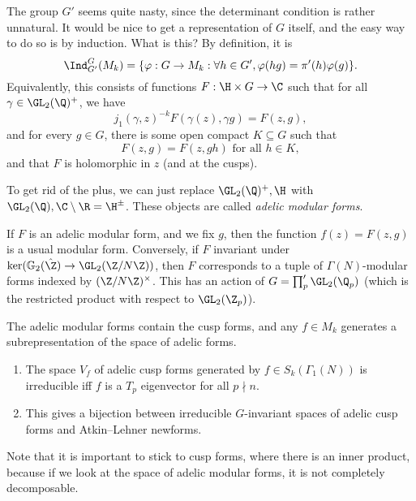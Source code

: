 \documentclass[a4paper]{article}
\renewcommand\G{\mathbb{G}}
\begin{document}
The group $G'$ seems quite nasty, since the determinant condition is rather unnatural. It would be nice to get a representation of $G$ itself, and the easy way to do so is by induction. What is this? By definition, it is
\[
  \Ind_{G'}^G(M_k) = \{\varphi: G \to M_k: \forall h \in G', \varphi(hg) = \pi'(h) \varphi(g)\}.
\]
Equivalently, this consists of functions $F: \H \times G \to \C$ such that for all $\gamma \in \GL_2(\Q)^+$, we have
\[
  j_1(\gamma, z)^{-k} F(\gamma(z), \gamma g) = F(z, g),
\]
and for every $g \in G$, there is some open compact $K \subseteq G$ such that
\[
  F(z, g) = F(z, gh) \text{ for all }h \in K,
\]
and that $F$ is holomorphic in $z$ (and at the cusps).

To get rid of the plus, we can just replace $\GL_2(\Q)^+, \H$ with $\GL_2(\Q), \C \setminus \R = \H^{\pm}$. These objects are called \emph{adelic modular forms}.

If $F$ is an adelic modular form, and we fix $g$, then the function $f(z) = F(z, g)$ is a usual modular form. Conversely, if $F$ invariant under $\ker (\G_2(\hat{\Z}) \to \GL_2(\Z/N\Z))$, then $F$ corresponds to a tuple of $\Gamma(N)$-modular forms indexed by $(\Z/N\Z)^\times$. This has an action of $G = \prod_p ' \GL_2(\Q_p)$ (which is the restricted product with respect to $\GL_2(\Z_p)$).

The adelic modular forms contain the cusp forms, and any $f \in M_k$ generates a subrepresentation of the space of adelic forms.

\begin{thm}\leavevmode
  \begin{enumerate}
    \item The space $V_f$ of adelic cusp forms generated by $f \in S_k(\Gamma_1(N))$ is irreducible iff $f$ is a $T_p$ eigenvector for all $p \nmid n$.
    \item This gives a bijection between irreducible $G$-invariant spaces of adelic cusp forms and Atkin--Lehner newforms.
  \end{enumerate}
\end{thm}
Note that it is important to stick to cusp forms, where there is an inner product, because if we look at the space of adelic modular forms, it is not completely decomposable.
\end{document}
